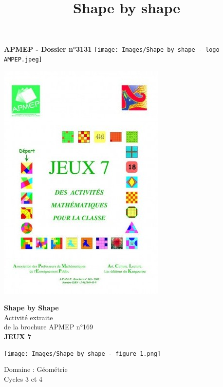 \documentclass[a4paper,10pt]{article}
\title{Shape by shape}
\date{}
\author{}
\begin{document}
\hfill {\textbf{\LARGE APMEP - Dossier n°3131}} \hfill {\texttt{[image: Images/Shape by shape - logo AMPEP.jpeg]}}

\vspace{2em}

\begin{minipage}[c]{0.45\textwidth}
	\hspace{-1.2cm}\includegraphics[width=0.8\linewidth,cframe=green 3pt,rotate=10]{Images/Shape by shape - des activités mathématiques pour la classe.jpeg}
	\vspace{1.5cm}
\end{minipage}
\begin{minipage}[c]{0.5\textwidth}
	{\Huge \textbf{Shape by Shape}}\\[1.2em]
	{\Large Activité extraite\\
	de la brochure APMEP n°169\\
	\textbf{JEUX 7} \vspace{1em}}

	\texttt{[image: Images/Shape by shape - figure 1.png]} \vspace{1em}

	{\Huge Domaine : Géométrie} \\[1.5em]
	{\LARGE Cycles 3 et 4}
\end{minipage} \vspace{1em}
\end{document}
